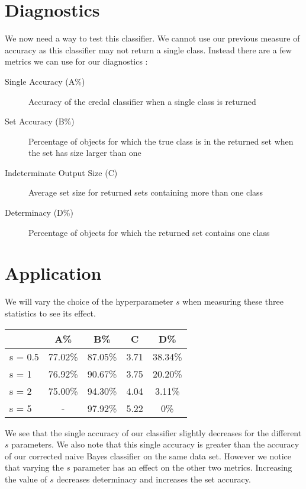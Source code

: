 \section{Diagnostics}

We now need a way to test this classifier.
We cannot use our previous measure of accuracy as this classifier may not return a single class.
Instead there are a few metrics we can use for our diagnostics \cite{Antonucci11}:
\begin{description}
	\item[Single Accuracy (A\%)] Accuracy of the credal classifier when a single class is returned
	\item[Set Accuracy (B\%)] Percentage of objects for which the true class is in the returned set when the set has size larger than one
	\item[Indeterminate Output Size (C)] Average set size for returned sets containing more than one class
	\item[Determinacy (D\%)] Percentage of objects for which the returned set contains one class
\end{description}

\section{Application}

We will vary the choice of the hyperparameter $s$ when measuring these three statistics to see its effect.


\begin{center}
\begin{tabular}{l|c c c c}
        & A\%     & B\%     & C    & D\%     \\
\hline
s = 0.5 & 77.02\% & 87.05\% & 3.71 & 38.34\% \\
s = 1   & 76.92\% & 90.67\% & 3.75 & 20.20\% \\
s = 2   & 75.00\% & 94.30\% & 4.04 & 3.11\% \\
s = 5   & -       & 97.92\% & 5.22 & 0\%   \\
\end{tabular}
\end{center}

We see that the single accuracy of our classifier slightly decreases for the different $s$ parameters.
We also note that this single accuracy is greater than the accuracy of our corrected naive Bayes classifier on the same data set.
However we notice that varying the $s$ parameter has an effect on the other two metrics.
Increasing the value of $s$ decreases determinacy and increases the set accuracy.

